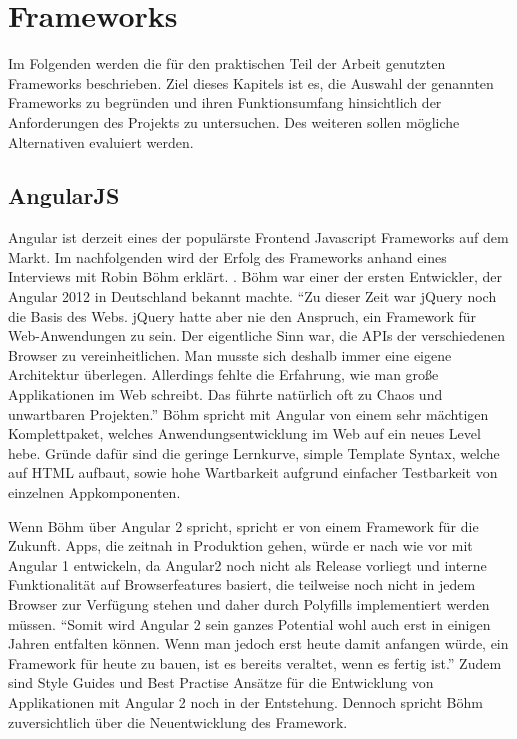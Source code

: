 
\chapter{Frameworks}
\label{chap:frameworks}

Im Folgenden werden die für den praktischen Teil der Arbeit genutzten Frameworks beschrieben.
Ziel dieses Kapitels ist es, die Auswahl der genannten Frameworks zu begründen und
ihren Funktionsumfang hinsichtlich der Anforderungen des Projekts zu untersuchen.
Des weiteren sollen mögliche Alternativen evaluiert werden.


\section{AngularJS}

Angular ist derzeit eines der populärste Frontend Javascript Frameworks auf dem Markt.
Im nachfolgenden wird der Erfolg des Frameworks anhand eines Interviews mit Robin Böhm erklärt. \cite{Angu68:online}.
Böhm war einer der ersten Entwickler, der Angular 2012 in Deutschland bekannt machte.
``Zu dieser Zeit war jQuery noch die Basis des Webs. jQuery hatte aber nie den Anspruch, ein Framework für Web-Anwendungen zu sein. Der eigentliche Sinn war, die APIs der verschiedenen Browser zu vereinheitlichen.
Man musste sich deshalb immer eine eigene Architektur überlegen. Allerdings fehlte die Erfahrung, wie man große Applikationen im Web schreibt. Das führte natürlich oft zu Chaos und unwartbaren Projekten.''\cite{Angu68:online}
Böhm spricht mit Angular von einem sehr mächtigen Komplettpaket, welches Anwendungsentwicklung im Web auf ein neues Level hebe.
Gründe dafür sind die geringe Lernkurve, simple Template Syntax,
welche auf HTML aufbaut, sowie hohe Wartbarkeit aufgrund einfacher Testbarkeit von einzelnen Appkomponenten.

Wenn Böhm über Angular 2 spricht, spricht er von einem Framework für die Zukunft.
Apps, die zeitnah in Produktion gehen, würde er nach wie vor mit Angular 1 entwickeln,
da Angular2 noch nicht als Release vorliegt und interne Funktionalität auf Browserfeatures basiert,
die teilweise noch nicht in jedem Browser zur Verfügung stehen und daher durch Polyfills implementiert werden müssen.
``Somit wird Angular 2 sein ganzes Potential wohl auch erst in einigen Jahren entfalten können.
Wenn man jedoch erst heute damit anfangen würde, ein Framework für heute zu bauen,
ist es bereits veraltet, wenn es fertig ist.''\cite{Angu68:online}
Zudem sind Style Guides und Best Practise Ansätze für die Entwicklung von Applikationen mit Angular 2
noch in der Entstehung.
Dennoch spricht Böhm zuversichtlich über die Neuentwicklung des Framework.


